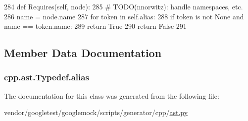 \begin{DoxyCode}
284     \textcolor{keyword}{def }Requires(self, node):
285         \textcolor{comment}{# TODO(nnorwitz): handle namespaces, etc.}
286         name = node.name
287         \textcolor{keywordflow}{for} token \textcolor{keywordflow}{in} self.alias:
288             \textcolor{keywordflow}{if} token \textcolor{keywordflow}{is} \textcolor{keywordflow}{not} \textcolor{keywordtype}{None} \textcolor{keywordflow}{and} name == token.name:
289                 \textcolor{keywordflow}{return} \textcolor{keyword}{True}
290         \textcolor{keywordflow}{return} \textcolor{keyword}{False}
291 
\end{DoxyCode}


\subsection{Member Data Documentation}
\subsubsection[{\texorpdfstring{alias}{alias}}]{\setlength{\rightskip}{0pt plus 5cm}cpp.\+ast.\+Typedef.\+alias}\hypertarget{classcpp_1_1ast_1_1Typedef_a3187a504dfbefe50b866b44902823c30}{}\label{classcpp_1_1ast_1_1Typedef_a3187a504dfbefe50b866b44902823c30}


The documentation for this class was generated from the following file\+:\begin{DoxyCompactItemize}
\item 
vendor/googletest/googlemock/scripts/generator/cpp/\hyperlink{ast_8py}{ast.\+py}\end{DoxyCompactItemize}
